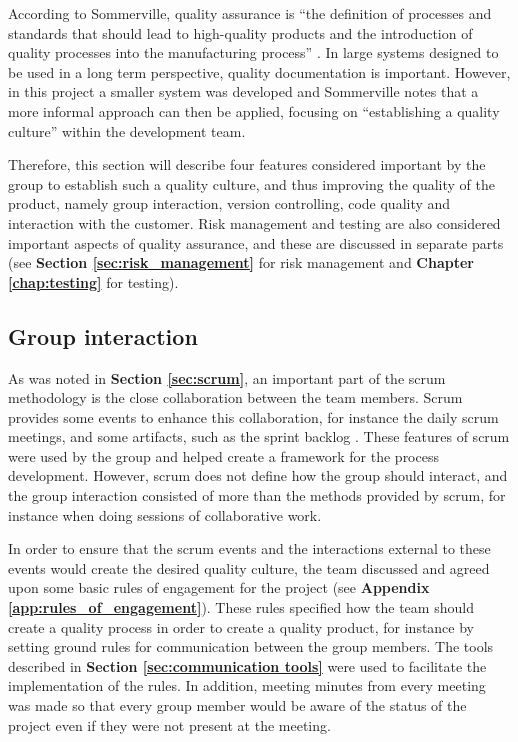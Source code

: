 According to Sommerville, quality assurance is “the definition of processes and standards that should lead to high-quality products and the introduction of quality processes into the manufacturing process” \cite[p.652]{Sommerville}. In large systems designed to be used in a long term perspective, quality documentation is important. However, in this project a smaller system was developed and Sommerville notes that a more informal approach can then be applied, focusing on “establishing a quality culture” \cite[p.654]{Sommerville} within the development team.\newline

Therefore, this section will describe four features considered important by the group to establish such a quality culture, and thus improving the quality of the product, namely group interaction, version controlling, code quality and interaction with the customer. Risk management and testing are also considered important aspects of quality assurance, and these are discussed in separate parts (see \textbf{Section \ref{sec:risk_management}} for risk management and \textbf{Chapter \ref{chap:testing}} for testing). 

\subsection{Group interaction}

As was noted in \textbf{Section \ref{sec:scrum}}, an important part of the scrum methodology is the close collaboration between the team members. Scrum provides some events to enhance this collaboration, for instance the daily scrum meetings, and some artifacts, such as the sprint backlog . These features of scrum were used by the group and helped create a framework for the process development. However, scrum does not define how the group should interact, and the group interaction consisted of more than the methods provided by scrum, for instance when doing sessions of collaborative work.\newline

In order to ensure that the scrum events and the interactions external to these events would create the desired quality culture, the team discussed and agreed upon some basic rules of engagement for the project (see \textbf{Appendix \ref{app:rules_of_engagement}}). These rules specified how the team should create a quality process in order to create a quality product, for instance by setting ground rules for communication between the group members. The tools described in \textbf{Section \ref{sec:communication tools}} were used to facilitate the implementation of the rules. In addition, meeting minutes from every meeting was made so that every group member would be aware of the status of the project even if they were not present at the meeting.\newline


